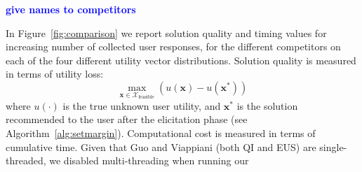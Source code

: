 \documentclass{article}
\renewcommand\[{\begin{equation}}
\renewcommand\]{\end{equation}}
\newcommand{\calvar}[1]{\ensuremath{\mathcal{#1}}}
\newcommand{\calX}{\calvar{X}}
\newcommand{\vecvar}[1]{\ensuremath{\boldsymbol{#1}}}
\newcommand{\vx}{\vecvar{x}}
\newcommand{\andrea}[1]{{\bf \textcolor{blue}{{\fbox{Andrea:} #1}}}}
\newcommand{\stefano}[1]{{\bf \textcolor{green}{{\fbox{Stefano:} #1}}}}
\newcommand{\paolo}[1]{{\bf \textcolor{red}{{\fbox{Paolo:} #1}}}}
\begin{document}
\andrea{give names to competitors}

In Figure~\ref{fig:comparison} we report solution quality and timing
values for increasing number of collected user responses, for the
different competitors on each of the four different utility vector
distributions. Solution quality is measured in terms of utility loss:
%
$$ \max_{\vx\in\calX_\text{feasible}} \left( u(\vx) - u(\vx^*) \right) $$
%
%
%
%
%
%
%
%
%
where $u(\cdot)$ is the true unknown user utility, and $\vx^*$ is the
solution recommended to the user after the elicitation phase (see
Algorithm~\ref{alg:setmargin}). Computational cost is measured in
terms of cumulative time. Given that Guo and Viappiani (both QI and
EUS) are single-threaded, we disabled multi-threading when running our
\end{document}
